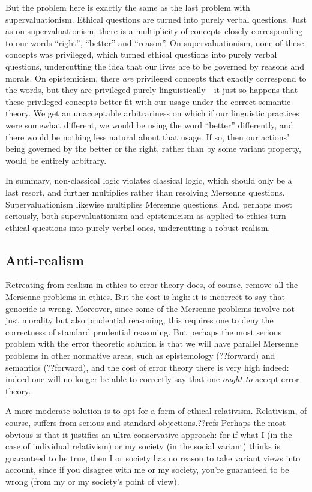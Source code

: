 But the problem here is exactly the same as the last problem with supervaluationism. Ethical questions are turned into purely verbal questions.
Just as on supervaluationism, there is a multiplicity of concepts closely corresponding to our words ``right'', ``better'' and ``reason''.
On supervaluationism, none of these concepts was privileged, which turned ethical questions into purely verbal questions, undercutting the idea
that our lives are to be governed by reasons and morals. On epistemicism, there \textit{are} privileged concepts that exactly correspond to the
words, but they are privileged purely linguistically---it just so happens that these privileged concepts better fit with our usage under the
correct semantic theory. We get an unacceptable arbitrariness on which if our linguistic practices were somewhat different, we would be using the 
word ``better'' differently, and there would be nothing less natural about that usage. If so, then our actions' being governed by the better 
or the right, rather than by some variant property, would be entirely arbitrary.

In summary, non-classical logic violates classical logic, which should only be a last resort, and further multiplies rather than resolving 
Mersenne questions. Supervaluationism likewise multiplies Mersenne questions. And, perhaps most seriously, both supervaluationism and 
epistemicism as applied to ethics turn ethical questions into purely verbal ones, undercutting a robust realism.

\subsection{Anti-realism}
Retreating from realism in ethics to error theory does, of course, remove all the Mersenne problems in ethics. But the
cost is high: it is incorrect to say that genocide is wrong. Moreover, since some of the Mersenne problems involve not
just morality but also prudential reasoning, this requires one to deny the correctness of standard prudential reasoning.
But perhaps the most serious problem with the error theoretic solution is that we will have parallel Mersenne problems
in other normative areas, such as epistemology (??forward) and semantics (??forward), and the cost of error theory 
there is very high indeed: indeed one will no longer  be able to correctly say that one \textit{ought to} accept error theory.

A more moderate solution is to opt for a form of ethical relativism. Relativism, of course, suffers from serious and
standard objections.??refs Perhaps the most obvious is that it justifies an ultra-conservative approach: for if what
I (in the case of individual relativism) or my society (in the social variant) thinks is guaranteed to be true, then
I or society has no reason to take variant views into account, since if you disagree with me or my society, you're guaranteed to be 
wrong (from my or my society's point of view).

